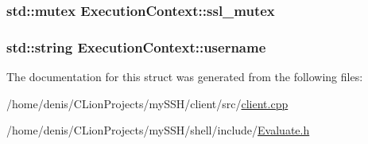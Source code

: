 \subsubsection[{\texorpdfstring{ssl\+\_\+mutex}{ssl_mutex}}]{\setlength{\rightskip}{0pt plus 5cm}std\+::mutex Execution\+Context\+::ssl\+\_\+mutex}\hypertarget{structExecutionContext_a241cad372197f9880a9af9e93ecd7633}{}\label{structExecutionContext_a241cad372197f9880a9af9e93ecd7633}
\subsubsection[{\texorpdfstring{username}{username}}]{\setlength{\rightskip}{0pt plus 5cm}std\+::string Execution\+Context\+::username}\hypertarget{structExecutionContext_a6c1bbd4dcfc82e4902c4382af69ab6d9}{}\label{structExecutionContext_a6c1bbd4dcfc82e4902c4382af69ab6d9}


The documentation for this struct was generated from the following files\+:\begin{DoxyCompactItemize}
\item 
/home/denis/\+C\+Lion\+Projects/my\+S\+S\+H/client/src/\hyperlink{client_8cpp}{client.\+cpp}\item 
/home/denis/\+C\+Lion\+Projects/my\+S\+S\+H/shell/include/\hyperlink{Evaluate_8h}{Evaluate.\+h}\end{DoxyCompactItemize}
